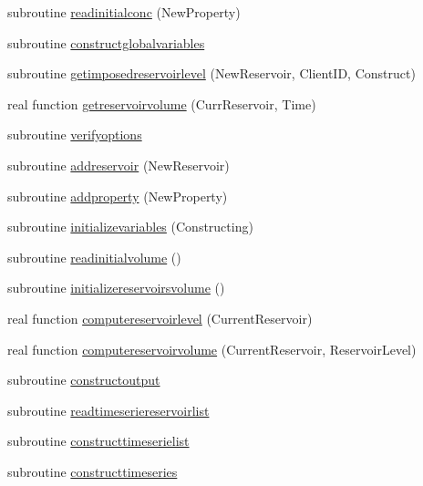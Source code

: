 \begin{DoxyCompactItemize}
subroutine \mbox{\hyperlink{namespacemodulereservoirs_a211f03dad795e61e39d0f58b7002bb26}{readinitialconc}} (New\+Property)
\item 
subroutine \mbox{\hyperlink{namespacemodulereservoirs_adb9f7b2b418dc95e774855d03c82b302}{constructglobalvariables}}
\item 
subroutine \mbox{\hyperlink{namespacemodulereservoirs_a22d1b1d83488cecbdcf52565d3aa4e99}{getimposedreservoirlevel}} (New\+Reservoir, Client\+ID, Construct)
\item 
real function \mbox{\hyperlink{namespacemodulereservoirs_afabb38607932bfaede946ccbce22734d}{getreservoirvolume}} (Curr\+Reservoir, Time)
\item 
subroutine \mbox{\hyperlink{namespacemodulereservoirs_af13cf54fd0c086fab90e6f36d294bc57}{verifyoptions}}
\item 
subroutine \mbox{\hyperlink{namespacemodulereservoirs_aae6c3ff2990d073d614eb9e50d1658b9}{addreservoir}} (New\+Reservoir)
\item 
subroutine \mbox{\hyperlink{namespacemodulereservoirs_a2452a1e02e4d13c0c920c8d181bf2e79}{addproperty}} (New\+Property)
\item 
subroutine \mbox{\hyperlink{namespacemodulereservoirs_a1e658ea45a1665c254648477f576c633}{initializevariables}} (Constructing)
\item 
subroutine \mbox{\hyperlink{namespacemodulereservoirs_a392b0a0c6b8aeaf0e9cd41b21b155341}{readinitialvolume}} ()
\item 
subroutine \mbox{\hyperlink{namespacemodulereservoirs_a3194d2a617c1c30dfa86442b6dbe1c31}{initializereservoirsvolume}} ()
\item 
real function \mbox{\hyperlink{namespacemodulereservoirs_a473bf29bfb29eda6a398dead645aec5a}{computereservoirlevel}} (Current\+Reservoir)
\item 
real function \mbox{\hyperlink{namespacemodulereservoirs_a5482b1f1fc7530ca5302b5dc3352566f}{computereservoirvolume}} (Current\+Reservoir, Reservoir\+Level)
\item 
subroutine \mbox{\hyperlink{namespacemodulereservoirs_a43db2f4830b1c886cf024e34a2682edb}{constructoutput}}
\item 
subroutine \mbox{\hyperlink{namespacemodulereservoirs_a24436967478aa33f4288a6cec5b2bb59}{readtimeseriereservoirlist}}
\item 
subroutine \mbox{\hyperlink{namespacemodulereservoirs_a8922a19edc4b29fdfa9899431548dabc}{constructtimeserielist}}
\item 
subroutine \mbox{\hyperlink{namespacemodulereservoirs_a8cfdd387909b50145910c908f6e129f0}{constructtimeseries}}

\end{DoxyCompactItemize}
